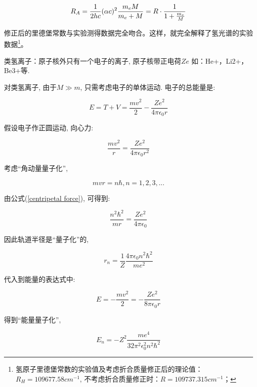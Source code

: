 
\begin{equation}\label{revised Rydberg}
    R_A  = \frac{1}{{2hc}}(\alpha c)^2 \frac{{m_e M}}{{m_e  + M}} = R \cdot \frac{1}{{1 + {\textstyle{{m_e } \over M}}}}
\end{equation}

修正后的里德堡常数与实验测得数据完全吻合。这样，就完全解释了氢光谱的实验数据\footnote{
氢原子里德堡常数的实验值及考虑折合质量修正后的理论值：$R_H =
109677.58 cm^{-1}$, 不考虑折合质量修正时：$R = 109737.315
cm^{-1}$；}。

类氢离子：原子核外只有一个电子的离子, 原子核带正电荷$Ze$
如：He+，Li2+，Be3+等.

对类氢离子, 由于$M \gg m$, 只需考虑电子的单体运动. 电子的总能量是:

\begin{equation*}
E = T+V = \frac{mv^2}{2}- \frac{Ze^2}{4\pi \epsilon_0 r}
\end{equation*}

假设电子作正圆运动, 向心力:

\begin{equation}\label{centripetal force}
\frac{mv^2}{r} = \frac{Ze^2}{4\pi \epsilon_0 r^2}
\end{equation}

考虑``角动量量子化'',

\begin{equation*}
mvr = n \hbar, n=1,2,3,...
\end{equation*}

由公式(\ref{centripetal force}), 可得到:

\begin{equation*}
\frac{n^2 \hbar^2}{mr}=\frac{Ze^2}{4\pi \epsilon_0 }
\end{equation*}

因此轨道半径是``量子化''的,

\begin{equation*}
r_n = \frac{1}{Z}  \frac{4\pi \epsilon_0 n^2 \hbar^2}{me^2}
\end{equation*}

代入到能量的表达式中:

\begin{equation*}
E = - \frac{mv^2}{2} = - \frac{Ze^2}{8 \pi \epsilon_0 r}
\end{equation*}

得到``能量量子化'',

\begin{equation*}
E_n = - Z^2 \frac{me^4}{32 \pi^2 \epsilon_0^2 n^2 \hbar^2}
\end{equation*}

